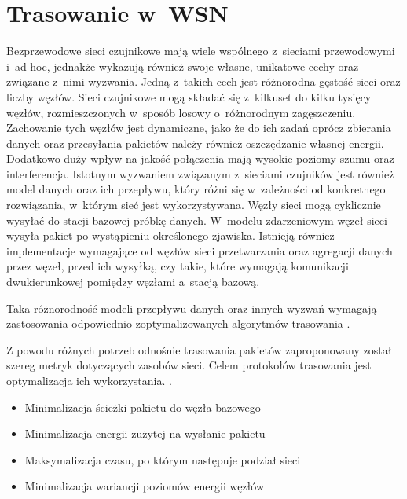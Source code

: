 \section{Trasowanie w~WSN} \label{routing}
Bezprzewodowe sieci czujnikowe mają wiele wspólnego z~sieciami przewodowymi i~ad-hoc, jednakże wykazują również swoje własne, unikatowe cechy oraz związane z~nimi wyzwania.
Jedną z~takich cech jest różnorodna gęstość sieci oraz liczby węzłów. Sieci czujnikowe mogą składać się z~kilkuset do kilku tysięcy węzłów, rozmieszczonych w~sposób losowy o~różnorodnym zagęszczeniu. Zachowanie tych węzłów jest dynamiczne, jako że do ich zadań oprócz zbierania danych oraz przesyłania pakietów należy również oszczędzanie własnej energii. Dodatkowo duży wpływ na jakość połączenia mają wysokie poziomy szumu oraz interferencja.
Istotnym wyzwaniem związanym z~sieciami czujników jest również model danych oraz ich przepływu, który różni się w~zależności od konkretnego rozwiązania, w~którym sieć jest wykorzystywana. Węzły sieci mogą cyklicznie wysyłać do stacji bazowej próbkę danych. W~modelu zdarzeniowym węzeł sieci wysyła pakiet po wystąpieniu określonego zjawiska. Istnieją również implementacje wymagające od węzłów sieci przetwarzania oraz agregacji danych przez węzeł, przed ich wysyłką, czy takie, które wymagają komunikacji dwukierunkowej pomiędzy węzłami a~stacją bazową.


Taka różnorodność modeli przepływu danych oraz innych wyzwań wymagają zastosowania odpowiednio zoptymalizowanych algorytmów trasowania \cite{Abdullah2014, Sohraby2006}.

Z powodu różnych potrzeb odnośnie trasowania pakietów zaproponowany został szereg metryk dotyczących zasobów sieci. Celem protokołów trasowania jest optymalizacja ich wykorzystania. \cite{Dargie2010, Biradar2009}.
\begin{itemize}
 \item Minimalizacja ścieżki pakietu do węzła bazowego
 \item Minimalizacja energii zużytej na wysłanie pakietu
 \item Maksymalizacja czasu, po którym następuje podział sieci
 \item Minimalizacja wariancji poziomów energii węzłów
\end{itemize}

